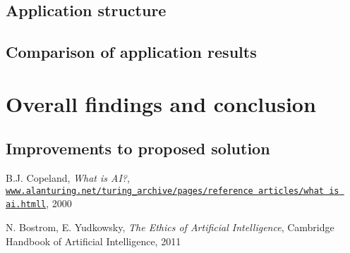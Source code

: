 \documentclass[article]{IEEEtran}
\begin{document}
\subsection{Application structure}

\subsection{Comparison of application results}

\section{Overall findings and conclusion}

\subsection{Improvements to proposed solution}

\begin{thebibliography}{9}

B.J. Copeland, \textit{What is AI?},
\\\texttt{\url{www.alanturing.net/turing_archive/pages/reference articles/what is ai.htmll}}, 2000

N. Bostrom, E. Yudkowsky, \textit{The Ethics of Artificial Intelligence},
Cambridge Handbook of Artificial Intelligence, 2011

\end{thebibliography}
\end{document}
